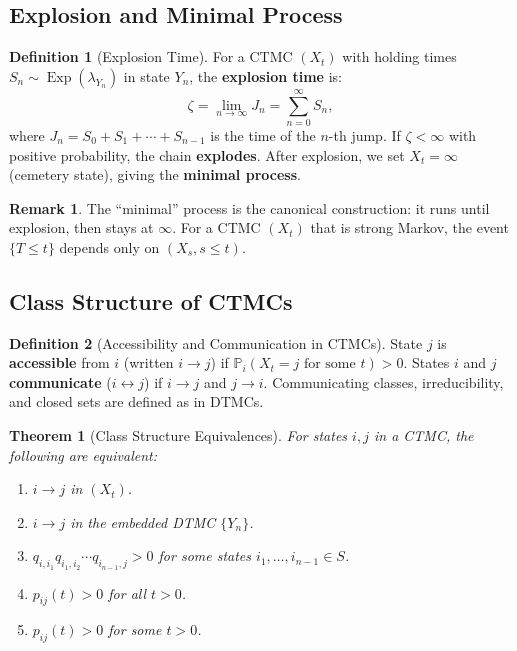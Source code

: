 \documentclass[12pt, a4paper]{article}
\theoremstyle{definition}
\newtheorem{definition}{Definition}[section]
\newtheorem{remark}{Remark}[section]
\theoremstyle{plain}
\newtheorem{theorem}{Theorem}[section]
\DeclareMathOperator{\Exp}{Exp}
\newcommand{\PP}{\mathbb{P}}
\begin{document}
\subsection{Explosion and Minimal Process}

\begin{definition}[Explosion Time]
For a CTMC $(X_t)$ with holding times $S_n \sim \Exp(\lambda_{Y_n})$ in state $Y_n$, the \textbf{explosion time} is:
\[
\zeta = \lim_{n\to\infty} J_n = \sum_{n=0}^\infty S_n,
\]
where $J_n = S_0 + S_1 + \cdots + S_{n-1}$ is the time of the $n$-th jump. If $\zeta < \infty$ with positive probability, the chain \textbf{explodes}. After explosion, we set $X_t = \infty$ (cemetery state), giving the \textbf{minimal process}.
\end{definition}

\begin{remark}
The ``minimal'' process is the canonical construction: it runs until explosion, then stays at $\infty$. For a CTMC $(X_t)$ that is strong Markov, the event $\{T \le t\}$ depends only on $(X_s, s \le t)$.
\end{remark}

\subsection{Class Structure of CTMCs}

\begin{definition}[Accessibility and Communication in CTMCs]
State $j$ is \textbf{accessible} from $i$ (written $i \to j$) if $\PP_i(X_t = j \text{ for some } t) > 0$.
States $i$ and $j$ \textbf{communicate} ($i \leftrightarrow j$) if $i \to j$ and $j \to i$.
Communicating classes, irreducibility, and closed sets are defined as in DTMCs.
\end{definition}

\begin{theorem}[Class Structure Equivalences]
For states $i, j$ in a CTMC, the following are equivalent:
\begin{enumerate}[label=(\roman*)]
  \item $i \to j$ in $(X_t)$.
  \item $i \to j$ in the embedded DTMC $\{Y_n\}$.
  \item $q_{i,i_1} q_{i_1,i_2} \cdots q_{i_{n-1},j} > 0$ for some states $i_1,\ldots,i_{n-1} \in S$.
  \item $p_{ij}(t) > 0$ for all $t > 0$.
  \item $p_{ij}(t) > 0$ for some $t > 0$.
\end{enumerate}
\end{theorem}
\end{document}
